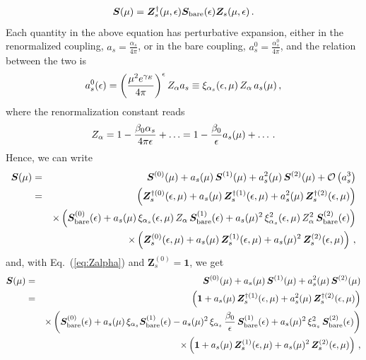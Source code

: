 \documentclass[a4paper,11pt]{report}
\numberwithin{equation}{section}
\newcommand{\bfS}{\bm{S}}
\newcommand{\bfZ}{\bm{Z}}
\newcommand{\bfI}{\bm{1}}
\begin{document}
%
\begin{equation}
  \bfS(\mu) = \bfZ^\dagger_s(\mu,\epsilon) \bfS_\bare(\epsilon)
  \bfZ_s(\mu,\epsilon)\,.
\end{equation}
%
Each quantity in the above equation has perturbative expansion, either in the
renormalized coupling, $a_s =
\frac{\alpha_s}{4\pi}$, or in the bare coupling,
$a_s^0 = \frac{\alpha_s^0}{4\pi}$, and the relation between the two is
%
\begin{equation}
  a_s^0(\epsilon) = 
  \left(\frac{\mu^2 e^{\gamma_E}}{4\pi}\right)^\epsilon Z_\alpha a_s
  \equiv \xi_{\alpha_s}(\epsilon,\mu)\, Z_\alpha\, a_s (\mu)\,,
\end{equation}
%
where the \msbar renormalization constant reads
%
\begin{equation}
  Z_\alpha = 
  1- \frac{\beta_0 {\alpha_s}}{4\pi \epsilon} + \ldots =
  1- \frac{\beta_0}{\epsilon} a_s(\mu) + \ldots\,.
  \label{eq:Zalpha}
\end{equation}
%
Hence, we can write
%
\begin{eqnarray}
  \bfS(\mu) & = &  
  \bfS^{(0)}(\mu) + a_s(\mu)\, \bfS^{(1)}(\mu) + a_s^2(\mu)\, \bfS^{(2)}(\mu) 
  + \order{a_s^3}
  \nonumber \\
  & = & 
  \left(\bfZ^{\dagger (0)}_s(\epsilon, \mu) + 
  a_s(\mu)\,\bfZ^{\dagger (1)}_s(\epsilon, \mu) + 
  a_s^2(\mu)\,\bfZ^{\dagger (2)}_s(\epsilon, \mu)  \right)
  \nonumber \\ & &
  \times \left(\bfS^{(0)}_\bare(\epsilon) + 
  a_s(\mu)\, \xi_\as(\epsilon, \mu)\, Z_\alpha\, \bfS^{(1)}_\bare(\epsilon) 
  + a_s(\mu)^2\, \xi_\as^2(\epsilon, \mu)\, Z_\alpha^2\,
    \bfS^{(2)}_\bare(\epsilon) \right)
  \\ & &
  \times 
  \left(\bfZ^{(0)}_s(\epsilon, \mu) + a_s(\mu)\,\bfZ^{(1)}_s(\epsilon, \mu) + 
  a_s(\mu)^2\,\bfZ^{(2)}_s(\epsilon, \mu)  \right)\,,
  \nonumber
\end{eqnarray}
%
and, with Eq.~(\ref{eq:Zalpha}) and $\bfZ_s^{(0)} = \bfI$, we get
%
\begin{eqnarray}
  \bfS(\mu) & = &  
  \bfS^{(0)}(\mu) + a_s(\mu)\, \bfS^{(1)}(\mu) + a_s^2(\mu)\, \bfS^{(2)}(\mu) 
  \nonumber \\
  & = & 
  \left(\bfI + 
  a_s(\mu)\,\bfZ^{\dagger (1)}_s(\epsilon, \mu) + 
  a_s^2(\mu)\,\bfZ^{\dagger (2)}_s(\epsilon, \mu)  \right)
  \nonumber \\ & &
  \times \left(\bfS^{(0)}_\bare(\epsilon) + 
  a_s(\mu)\, \xi_\as \bfS^{(1)}_\bare(\epsilon) -
  a_s(\mu)^2\, \xi_\as\,  \frac{\beta_0}{\epsilon}\, \bfS^{(1)}_\bare(\epsilon) 
  + a_s(\mu)^2\, \xi_\as^2\, 
    \bfS^{(2)}_\bare(\epsilon) \right)
  \nonumber \\ & &
  \times 
  \left(\bfI+ a_s(\mu)\,\bfZ^{(1)}_s(\epsilon, \mu) + 
  a_s(\mu)^2\,\bfZ^{(2)}_s(\epsilon, \mu)  \right)\,,
  \nonumber
\end{eqnarray}
\end{document}
